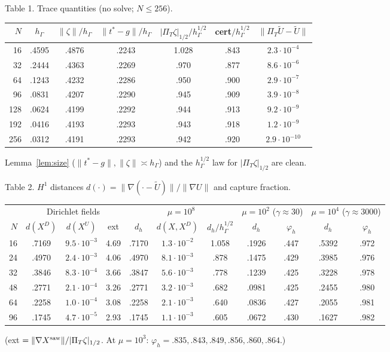 \documentclass[11pt]{article}
\theoremstyle{remark}
\newcommand{\hG}{h_\Gamma}
\newcommand{\PT}{\Pi_T}
\newcommand{\norm}[1]{\|#1\|}
\newcommand{\Ut}{\tilde U}
\begin{document}
\begin{center}\small
Table 1. Trace quantities (no solve; $N\le256$).\\[2pt]
\begin{tabular}{rcccccc}
\toprule
$N$ & $\hG$ & $\norm\zeta/\hG$ & $\norm{t^\ast-g}/\hG$ & $|\PT\zeta|_{1/2}/\hG^{1/2}$ & cert$/\hG^{1/2}$ & $\norm{\PT\Ut-\Ut}$\\
\midrule
16 & .4595 & .4876 & .2243 & 1.028 & .843 & $2.3\cdot10^{-4}$\\
32 & .2444 & .4363 & .2269 & .970 & .877 & $8.6\cdot10^{-6}$\\
64 & .1243 & .4232 & .2286 & .950 & .900 & $2.9\cdot10^{-7}$\\
96 & .0831 & .4207 & .2290 & .945 & .909 & $3.9\cdot10^{-8}$\\
128 & .0624 & .4199 & .2292 & .944 & .913 & $9.2\cdot10^{-9}$\\
192 & .0416 & .4193 & .2293 & .943 & .918 & $1.2\cdot10^{-9}$\\
256 & .0312 & .4191 & .2293 & .942 & .920 & $2.9\cdot10^{-10}$\\
\bottomrule
\end{tabular}
\end{center}
Lemma~\ref{lem:size} ($\norm{t^\ast-g},\norm\zeta\asymp\hG$) and the $\hG^{1/2}$ law for $|\PT\zeta|_{1/2}$ are clean.

\begin{center}\small
Table 2. $H^1$ distances $d(\cdot)=\norm{\nabla(\cdot-\Ut)}/\norm{\nabla U}$ and capture fraction.\\[2pt]
\begin{tabular}{r|ccc|ccc|cc|cc}
\toprule
& \multicolumn{3}{c|}{Dirichlet fields} & \multicolumn{3}{c|}{$\mu=10^8$} & \multicolumn{2}{c|}{$\mu=10^2$ ($\gamma\approx30$)} & \multicolumn{2}{c}{$\mu=10^4$ ($\gamma\approx3000$)}\\
$N$ & $d(X^D)$ & $d(X^U)$ & ext & $d_h$ & $d(X,X^D)$ & $d_h/\hG^{1/2}$ & $d_h$ & $\varphi_h$ & $d_h$ & $\varphi_h$\\
\midrule
16 & .7169 & $9.5\cdot10^{-3}$ & 4.69 & .7170 & $1.3\cdot10^{-2}$ & 1.058 & .1926 & .447 & .5392 & .972\\
24 & .4970 & $2.4\cdot10^{-3}$ & 4.06 & .4970 & $8.1\cdot10^{-3}$ & .878 & .1475 & .429 & .3985 & .976\\
32 & .3846 & $8.3\cdot10^{-4}$ & 3.66 & .3847 & $5.6\cdot10^{-3}$ & .778 & .1239 & .425 & .3228 & .978\\
48 & .2771 & $2.1\cdot10^{-4}$ & 3.26 & .2771 & $3.2\cdot10^{-3}$ & .682 & .0981 & .425 & .2455 & .980\\
64 & .2258 & $1.0\cdot10^{-4}$ & 3.08 & .2258 & $2.1\cdot10^{-3}$ & .640 & .0836 & .427 & .2055 & .981\\
96 & .1745 & $4.7\cdot10^{-5}$ & 2.93 & .1745 & $1.1\cdot10^{-3}$ & .605 & .0672 & .430 & .1627 & .982\\
\bottomrule
\end{tabular}
\end{center}
(ext $=\norm{\nabla X^{\rm saw}}/|\PT\zeta|_{1/2}$. At $\mu=10^3$: $\varphi_h=.835,.843,.849,.856,.860,.864$.)
\end{document}
